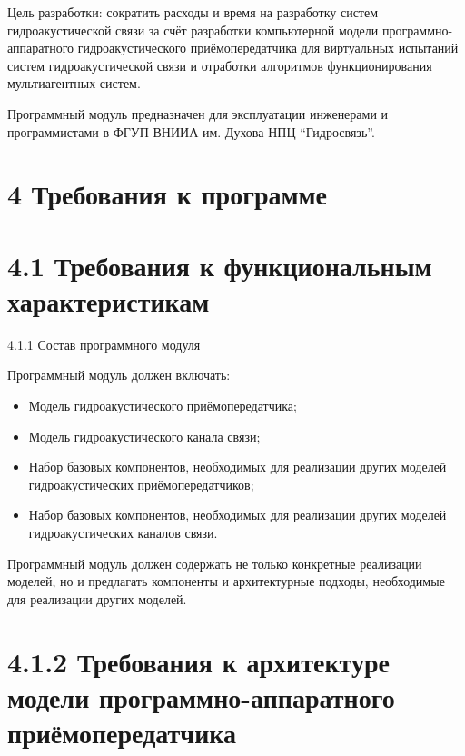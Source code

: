Цель разработки: сократить расходы и время на разработку систем
гидроакустической связи за счёт разработки компьютерной модели
программно-аппаратного гидроакустического приёмопередатчика для
виртуальных испытаний систем гидроакустической связи и отработки
алгоритмов функционирования мультиагентных систем.

Программный модуль предназначен для эксплуатации инженерами и
программистами в ФГУП ВНИИА им. Духова НПЦ ``Гидросвязь''.

\section{4 Требования к
программе}\label{ux442ux440ux435ux431ux43eux432ux430ux43dux438ux44f-ux43a-ux43fux440ux43eux433ux440ux430ux43cux43cux435}

\section{4.1 Требования к функциональным
характеристикам}\label{ux442ux440ux435ux431ux43eux432ux430ux43dux438ux44f-ux43a-ux444ux443ux43dux43aux446ux438ux43eux43dux430ux43bux44cux43dux44bux43c-ux445ux430ux440ux430ux43aux442ux435ux440ux438ux441ux442ux438ux43aux430ux43c}

4.1.1 Состав программного модуля

Программный модуль должен включать:

\begin{itemize}
\item
  Модель гидроакустического приёмопередатчика;
\item
  Модель гидроакустического канала связи;
\item
  Набор базовых компонентов, необходимых для реализации других моделей
  гидроакустических приёмопередатчиков;
\item
  Набор базовых компонентов, необходимых для реализации других моделей
  гидроакустических каналов связи.
\end{itemize}

Программный модуль должен содержать не только конкретные реализации
моделей, но и предлагать компоненты и архитектурные подходы, необходимые
для реализации других моделей.

\section{4.1.2 Требования к архитектуре модели программно-аппаратного
приёмопередатчика}\label{ux442ux440ux435ux431ux43eux432ux430ux43dux438ux44f-ux43a-ux430ux440ux445ux438ux442ux435ux43aux442ux443ux440ux435-ux43cux43eux434ux435ux43bux438-ux43fux440ux43eux433ux440ux430ux43cux43cux43dux43e-ux430ux43fux43fux430ux440ux430ux442ux43dux43eux433ux43e-ux43fux440ux438ux451ux43cux43eux43fux435ux440ux435ux434ux430ux442ux447ux438ux43aux430}

